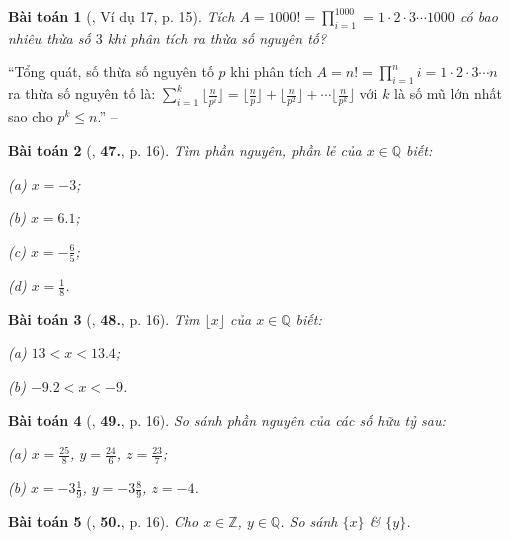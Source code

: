 \documentclass{article}
\numberwithin{equation}{section}
\newtheorem{baitoan}{Bài toán}[section]
\begin{document}
\begin{baitoan}[\cite{Tuyen_Toan_7}, Ví dụ 17, p. 15]
	Tích $A = 1000! = \prod_{i=1}^{1000} = 1\cdot 2\cdot 3\cdots 1000$ có bao nhiêu thừa số $3$ khi phân tích ra thừa số nguyên tố?
\end{baitoan}
``Tổng quát, số thừa số nguyên tố $p$ khi phân tích $A = n! = \prod_{i=1}^n i = 1\cdot 2\cdot 3\cdots n$ ra thừa số nguyên tố là: $\sum_{i=1}^k \lfloor\frac{n}{p^i}\rfloor = \lfloor\frac{n}{p}\rfloor + \lfloor\frac{n}{p^2}\rfloor + \cdots \lfloor\frac{n}{p^k}\rfloor$ với $k$ là số mũ lớn nhất sao cho $p^k\le n$.'' -- \cite[p. 15]{Tuyen_Toan_7} 

\begin{baitoan}[\cite{Tuyen_Toan_7}, \textbf{47.}, p. 16]
	Tìm phần nguyên, phần lẻ của $x\in\mathbb{Q}$ biết:
	\begin{enumerate*}
		\item[(a)] $x = -3$;
		\item[(b)] $x = 6.1$;
		\item[(c)] $x = -\frac{6}{5}$;
		\item[(d)] $x = \frac{1}{8}$.
	\end{enumerate*}
\end{baitoan}

\begin{baitoan}[\cite{Tuyen_Toan_7}, \textbf{48.}, p. 16]
	Tìm $\lfloor x\rfloor$ của $x\in\mathbb{Q}$ biết:
	\begin{enumerate*}
		\item[(a)] $13 < x < 13.4$;
		\item[(b)] $-9.2 < x < -9$.
	\end{enumerate*}
\end{baitoan}

\begin{baitoan}[\cite{Tuyen_Toan_7}, \textbf{49.}, p. 16]
	So sánh phần nguyên của các số hữu tỷ sau:
	\begin{enumerate*}
		\item[(a)] $x = \frac{25}{8}$, $y  = \frac{24}{6}$, $z = \frac{23}{7}$;
		\item[(b)] $x = -3\frac{1}{9}$, $y = -3\frac{8}{9}$, $z = -4$.
	\end{enumerate*}
\end{baitoan}

\begin{baitoan}[\cite{Tuyen_Toan_7}, \textbf{50.}, p. 16]
	Cho $x\in\mathbb{Z}$, $y\in\mathbb{Q}$. So sánh $\{x\}$ \& $\{y\}$.
\end{baitoan}
\end{document}
